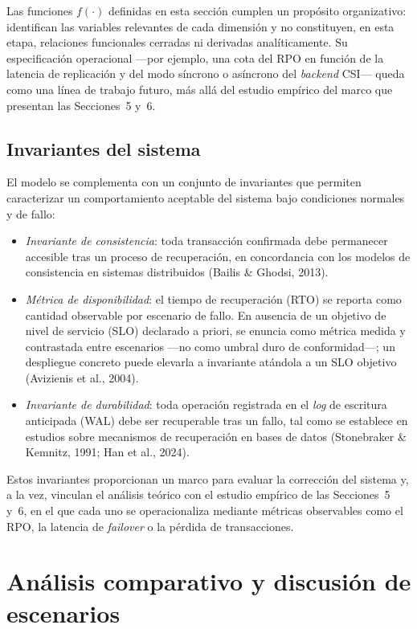 \documentclass[12pt,twocolumn,letterpaper]{article}
\begin{document}
Las funciones $f(\cdot)$ definidas en esta sección cumplen un propósito organizativo: identifican las variables relevantes de cada dimensión y no constituyen, en esta etapa, relaciones funcionales cerradas ni derivadas analíticamente. Su especificación operacional —por ejemplo, una cota del RPO en función de la latencia de replicación y del modo síncrono o asíncrono del \textit{backend} CSI— queda como una línea de trabajo futuro, más allá del estudio empírico del marco que presentan las Secciones~5 y~6.

\subsection{Invariantes del sistema}
El modelo se complementa con un conjunto de invariantes que permiten caracterizar un comportamiento aceptable del sistema bajo condiciones normales y de fallo:
\begin{itemize}[leftmargin=1.2em,itemsep=2pt,topsep=2pt]
\item \textit{Invariante de consistencia}: toda transacción confirmada debe permanecer accesible tras un proceso de recuperación, en concordancia con los modelos de consistencia en sistemas distribuidos (Bailis \& Ghodsi, 2013).
\item \textit{Métrica de disponibilidad}: el tiempo de recuperación (RTO) se reporta como cantidad observable por escenario de fallo. En ausencia de un objetivo de nivel de servicio (SLO) declarado a priori, se enuncia como métrica medida y contrastada entre escenarios —no como umbral duro de conformidad—; un despliegue concreto puede elevarla a invariante atándola a un SLO objetivo (Avizienis et al., 2004).
\item \textit{Invariante de durabilidad}: toda operación registrada en el \textit{log} de escritura anticipada (WAL) debe ser recuperable tras un fallo, tal como se establece en estudios sobre mecanismos de recuperación en bases de datos (Stonebraker \& Kemnitz, 1991; Han et al., 2024).
\end{itemize}
Estos invariantes proporcionan un marco para evaluar la corrección del sistema y, a la vez, vinculan el análisis teórico con el estudio empírico de las Secciones~5 y~6, en el que cada uno se operacionaliza mediante métricas observables como el RPO, la latencia de \textit{failover} o la pérdida de transacciones.

\section{Análisis comparativo y discusión de escenarios}
\end{document}
